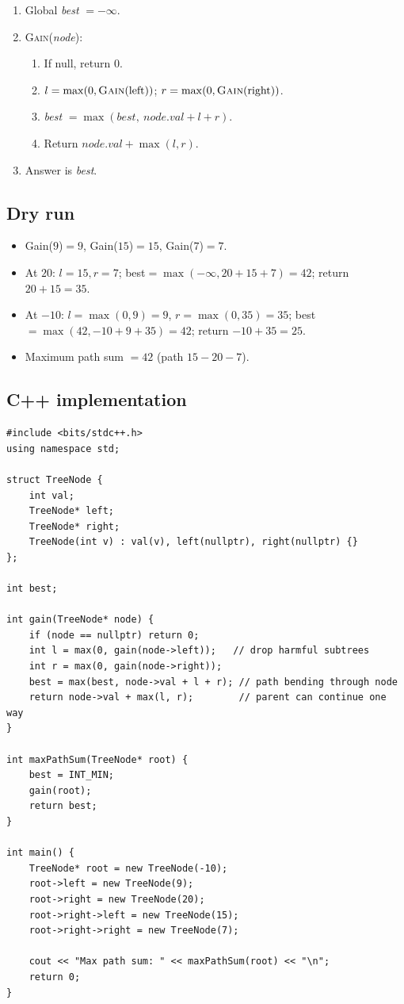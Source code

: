 \begin{enumerate}
  \item Global \textit{best} $=-\infty$.
  \item \textsc{Gain}(\textit{node}):
  \begin{enumerate}
    \item If null, return $0$.
    \item $l=\max(0,\textsc{Gain}(\text{left}))$;
          $r=\max(0,\textsc{Gain}(\text{right}))$.
    \item \textit{best} $=\max(\textit{best},\ node.val+l+r)$.
    \item Return $node.val+\max(l,r)$.
  \end{enumerate}
  \item Answer is \textit{best}.
\end{enumerate}

\subsection*{Dry run}


\begin{itemize}
  \item Gain($9$)$=9$, Gain($15$)$=15$, Gain($7$)$=7$.
  \item At $20$: $l=15,r=7$; best$=\max(-\infty,20+15+7)=42$; return
        $20+15=35$.
  \item At $-10$: $l=\max(0,9)=9$, $r=\max(0,35)=35$;
        best$=\max(42,-10+9+35)=42$; return $-10+35=25$.
  \item Maximum path sum $=42$ (path $15\!-\!20\!-\!7$).
\end{itemize}

\subsection*{C++ implementation}

\begin{lstlisting}
#include <bits/stdc++.h>
using namespace std;

struct TreeNode {
    int val;
    TreeNode* left;
    TreeNode* right;
    TreeNode(int v) : val(v), left(nullptr), right(nullptr) {}
};

int best;

int gain(TreeNode* node) {
    if (node == nullptr) return 0;
    int l = max(0, gain(node->left));   // drop harmful subtrees
    int r = max(0, gain(node->right));
    best = max(best, node->val + l + r); // path bending through node
    return node->val + max(l, r);        // parent can continue one way
}

int maxPathSum(TreeNode* root) {
    best = INT_MIN;
    gain(root);
    return best;
}

int main() {
    TreeNode* root = new TreeNode(-10);
    root->left = new TreeNode(9);
    root->right = new TreeNode(20);
    root->right->left = new TreeNode(15);
    root->right->right = new TreeNode(7);

    cout << "Max path sum: " << maxPathSum(root) << "\n";
    return 0;
}
\end{lstlisting}

